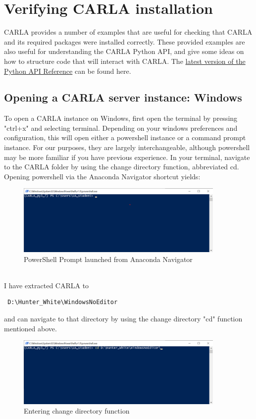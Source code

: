 \documentclass[12pt,oneside,letterpaper]{article}
\begin{document}
\section{Verifying CARLA installation}
\label{sec:verifyInstall}
CARLA provides a number of examples that are useful for checking that CARLA and its required packages were installed correctly. These provided examples are also useful for understanding the CARLA Python API, and give some ideas on how to structure code that will interact with CARLA. The \href{https://carla.readthedocs.io/en/latest/python_api/}{latest version of the Python API Reference} can be found here. 

\subsection{Opening a CARLA server instance: Windows}
\label{sec:CARLAserverwindows}
To open a CARLA instance on Windows, first open the terminal by pressing "ctrl+x" and selecting terminal. Depending on your windows preferences and configuration, this will open either a powershell instance or a command prompt instance. For our purposes, they are largely interchangeable, although powershell may be more familiar if you have previous experience. In your terminal, navigate to the CARLA folder by using the change directory function, abbreviated cd.  
Opening powershell via the Anaconda Navigator shortcut yields:
\begin{figure}[h]
\centering
\includegraphics[width=0.9\textwidth, trim=0cm 4.5cm 0cm 0cm, clip]{Command_Prompt_1}
\caption{PowerShell Prompt launched from Anaconda Navigator}
\label{fig:com_prompt1}
\end{figure}
\\
I have extracted CARLA to \begin{verbatim} D:\Hunter_White\WindowsNoEditor \end{verbatim} and can navigate to that directory by using the change directory "cd" function mentioned above.

\begin{figure}[h]
\centering
\includegraphics[width=0.9\textwidth, trim=0cm 4.5cm 0cm 0cm, clip]{Command_Prompt_2} %
\caption{Entering change directory function}
\label{fig:com_prompt2}
\end{figure}
\end{document}
